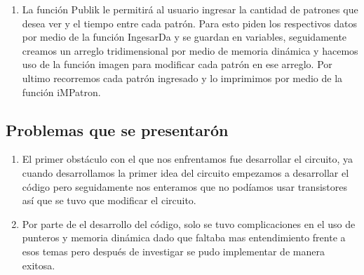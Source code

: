 \documentclass{article}
\begin{document}
\begin{enumerate}
      \item La función Publik le permitirá al usuario ingresar la cantidad de patrones que desea ver y el tiempo entre cada patrón. Para esto piden los respectivos datos por medio de la función IngesarDa y se guardan en variables, seguidamente creamos un arreglo tridimensional por medio de memoria dinámica y hacemos uso de la función imagen para modificar cada patrón en ese arreglo. Por ultimo recorremos cada patrón ingresado y lo imprimimos por medio de la función iMPatron. 
    
    
\end{enumerate}
\subsection{Problemas que se presentarón}
\begin{enumerate}
    \item El primer obstáculo con el que nos enfrentamos fue desarrollar el circuito, ya cuando desarrollamos la primer idea del circuito empezamos a desarrollar el código pero seguidamente nos enteramos que no podíamos usar transistores así que se tuvo que modificar el circuito.    
    \item Por parte de el desarrollo del código, solo se tuvo complicaciones en el uso de punteros y memoria dinámica dado que faltaba mas entendimiento frente a esos temas pero después de investigar se pudo implementar de manera exitosa.
\end{enumerate}
\end{document}
